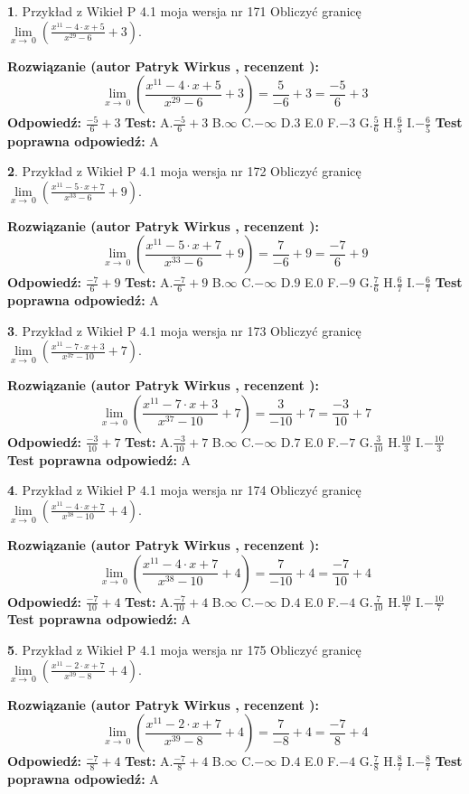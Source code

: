 \documentclass[12pt, a4paper]{article}
\theoremstyle{definition} %
\newtheorem{zad}{}
\newcommand{\zadStart}[1]{\begin{zad}#1\newline}
\newcommand{\zadStop}{\end{zad}}
\newcommand{\rozwStart}[2]{\noindent \textbf{Rozwiązanie (autor #1 , recenzent #2): }\newline}
\newcommand{\rozwStop}{\newline}
\newcommand{\odpStart}{\noindent \textbf{Odpowiedź:}\newline}
\newcommand{\odpStop}{\newline}
\newcommand{\testStart}{\noindent \textbf{Test:}\newline}
\newcommand{\testStop}{\newline}
\newcommand{\kluczStart}{\noindent \textbf{Test poprawna odpowiedź:}\newline}
\newcommand{\kluczStop}{\newline}
\begin{document}
\zadStart{Przykład z Wikieł P 4.1 moja wersja nr 171}
Obliczyć granicę $\lim\limits_{x\to\ 0}(\frac{x^{11}-4 \cdot x +5}{x^{29}-6}+3)$.
\zadStop
\rozwStart{Patryk Wirkus}{}
$$\lim\limits_{x\to\ 0}(\frac{x^{11}-4 \cdot x +5}{x^{29}-6}+3)=\frac{5}{-6}+3=\frac{-5}{6}+3$$
\rozwStop
\odpStart
$\frac{-5}{6}+3$
\odpStop
\testStart
A.$\frac{-5}{6}+3$
B.$\infty$
C.$-\infty$
D.$3$
E.$0$
F.$-3$
G.$\frac{5}{6}$
H.$\frac{6}{5}$
I.$-\frac{6}{5}$
\testStop
\kluczStart
A
\kluczStop



\zadStart{Przykład z Wikieł P 4.1 moja wersja nr 172}
Obliczyć granicę $\lim\limits_{x\to\ 0}(\frac{x^{11}-5 \cdot x +7}{x^{33}-6}+9)$.
\zadStop
\rozwStart{Patryk Wirkus}{}
$$\lim\limits_{x\to\ 0}(\frac{x^{11}-5 \cdot x +7}{x^{33}-6}+9)=\frac{7}{-6}+9=\frac{-7}{6}+9$$
\rozwStop
\odpStart
$\frac{-7}{6}+9$
\odpStop
\testStart
A.$\frac{-7}{6}+9$
B.$\infty$
C.$-\infty$
D.$9$
E.$0$
F.$-9$
G.$\frac{7}{6}$
H.$\frac{6}{7}$
I.$-\frac{6}{7}$
\testStop
\kluczStart
A
\kluczStop



\zadStart{Przykład z Wikieł P 4.1 moja wersja nr 173}
Obliczyć granicę $\lim\limits_{x\to\ 0}(\frac{x^{11}-7 \cdot x +3}{x^{37}-10}+7)$.
\zadStop
\rozwStart{Patryk Wirkus}{}
$$\lim\limits_{x\to\ 0}(\frac{x^{11}-7 \cdot x +3}{x^{37}-10}+7)=\frac{3}{-10}+7=\frac{-3}{10}+7$$
\rozwStop
\odpStart
$\frac{-3}{10}+7$
\odpStop
\testStart
A.$\frac{-3}{10}+7$
B.$\infty$
C.$-\infty$
D.$7$
E.$0$
F.$-7$
G.$\frac{3}{10}$
H.$\frac{10}{3}$
I.$-\frac{10}{3}$
\testStop
\kluczStart
A
\kluczStop



\zadStart{Przykład z Wikieł P 4.1 moja wersja nr 174}
Obliczyć granicę $\lim\limits_{x\to\ 0}(\frac{x^{11}-4 \cdot x +7}{x^{38}-10}+4)$.
\zadStop
\rozwStart{Patryk Wirkus}{}
$$\lim\limits_{x\to\ 0}(\frac{x^{11}-4 \cdot x +7}{x^{38}-10}+4)=\frac{7}{-10}+4=\frac{-7}{10}+4$$
\rozwStop
\odpStart
$\frac{-7}{10}+4$
\odpStop
\testStart
A.$\frac{-7}{10}+4$
B.$\infty$
C.$-\infty$
D.$4$
E.$0$
F.$-4$
G.$\frac{7}{10}$
H.$\frac{10}{7}$
I.$-\frac{10}{7}$
\testStop
\kluczStart
A
\kluczStop



\zadStart{Przykład z Wikieł P 4.1 moja wersja nr 175}
Obliczyć granicę $\lim\limits_{x\to\ 0}(\frac{x^{11}-2 \cdot x +7}{x^{39}-8}+4)$.
\zadStop
\rozwStart{Patryk Wirkus}{}
$$\lim\limits_{x\to\ 0}(\frac{x^{11}-2 \cdot x +7}{x^{39}-8}+4)=\frac{7}{-8}+4=\frac{-7}{8}+4$$
\rozwStop
\odpStart
$\frac{-7}{8}+4$
\odpStop
\testStart
A.$\frac{-7}{8}+4$
B.$\infty$
C.$-\infty$
D.$4$
E.$0$
F.$-4$
G.$\frac{7}{8}$
H.$\frac{8}{7}$
I.$-\frac{8}{7}$
\testStop
\kluczStart
A
\kluczStop
\end{document}
